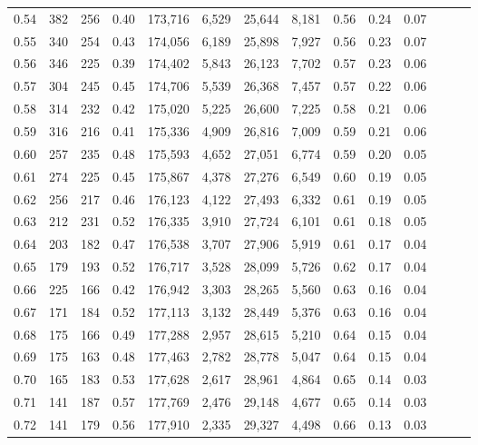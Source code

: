 \begin{tabular}{rrrrrrrrrrrrrr}
0.54 &     382 &  256 &  0.40 &  173,716 &    6,529 &  25,644 &   8,181 &  0.56 &  0.24 &      0.07 \\
0.55 &     340 &  254 &  0.43 &  174,056 &    6,189 &  25,898 &   7,927 &  0.56 &  0.23 &      0.07 \\
0.56 &     346 &  225 &  0.39 &  174,402 &    5,843 &  26,123 &   7,702 &  0.57 &  0.23 &      0.06 \\
0.57 &     304 &  245 &  0.45 &  174,706 &    5,539 &  26,368 &   7,457 &  0.57 &  0.22 &      0.06 \\
0.58 &     314 &  232 &  0.42 &  175,020 &    5,225 &  26,600 &   7,225 &  0.58 &  0.21 &      0.06 \\
0.59 &     316 &  216 &  0.41 &  175,336 &    4,909 &  26,816 &   7,009 &  0.59 &  0.21 &      0.06 \\
0.60 &     257 &  235 &  0.48 &  175,593 &    4,652 &  27,051 &   6,774 &  0.59 &  0.20 &      0.05 \\
0.61 &     274 &  225 &  0.45 &  175,867 &    4,378 &  27,276 &   6,549 &  0.60 &  0.19 &      0.05 \\
0.62 &     256 &  217 &  0.46 &  176,123 &    4,122 &  27,493 &   6,332 &  0.61 &  0.19 &      0.05 \\
0.63 &     212 &  231 &  0.52 &  176,335 &    3,910 &  27,724 &   6,101 &  0.61 &  0.18 &      0.05 \\
0.64 &     203 &  182 &  0.47 &  176,538 &    3,707 &  27,906 &   5,919 &  0.61 &  0.17 &      0.04 \\
0.65 &     179 &  193 &  0.52 &  176,717 &    3,528 &  28,099 &   5,726 &  0.62 &  0.17 &      0.04 \\
0.66 &     225 &  166 &  0.42 &  176,942 &    3,303 &  28,265 &   5,560 &  0.63 &  0.16 &      0.04 \\
0.67 &     171 &  184 &  0.52 &  177,113 &    3,132 &  28,449 &   5,376 &  0.63 &  0.16 &      0.04 \\
0.68 &     175 &  166 &  0.49 &  177,288 &    2,957 &  28,615 &   5,210 &  0.64 &  0.15 &      0.04 \\
0.69 &     175 &  163 &  0.48 &  177,463 &    2,782 &  28,778 &   5,047 &  0.64 &  0.15 &      0.04 \\
0.70 &     165 &  183 &  0.53 &  177,628 &    2,617 &  28,961 &   4,864 &  0.65 &  0.14 &      0.03 \\
0.71 &     141 &  187 &  0.57 &  177,769 &    2,476 &  29,148 &   4,677 &  0.65 &  0.14 &      0.03 \\
0.72 &     141 &  179 &  0.56 &  177,910 &    2,335 &  29,327 &   4,498 &  0.66 &  0.13 &      0.03 \\

\end{tabular}
